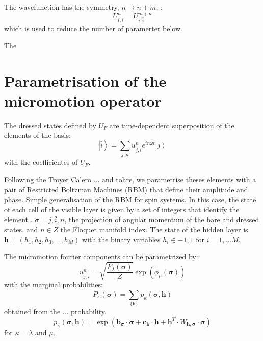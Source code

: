 \documentclass[pra,twocolumn,showkeys,preprintnumbers, amsmath,amssymb, aps,A4paper]{revtex4-1}
\begin{document}
The wavefunction has the symmetry, $n \rightarrow n+m$,  :
\begin{equation}
U_{i,\bar{i}}^n = U_{i,\bar{i}}^{m+n}
\end{equation}
which is used to reduce the number of paramerter below.

The 

\section{Parametrisation of the micromotion operator}

The dressed states defined by $U_F$ are time-dependent superposition of the elements of the basis:
\begin{equation}
\left| \bar{i} \right\rangle = \sum_{j,n} u^{n}_{j,\bar{i}} e^{i n \omega t}\left|j \right\rangle
\end{equation}
with the coefficientes of $U_F$. 

Following the Troyer Calero ... and tohre, we parametrise theses elements with a pair of Restricted Boltzman Machines (RBM) that define their amplitude and phase. Simple generalisation of the RBM for spin systems. In this case, the state of each cell of the visible layer is given by a set of integers that identify the element .  $\sigma = {j,\bar{i},n}$, the projection of angular momentum of the bare and dressed states, and $n\in Z$ the Floquet manifold index. The state of the hidden layer is $\boldsymbol{h} = (h_1,h_2,h_3,\ldots,h_M)$ with the binary variables $h_i \in {-1,1}$ for $i=1,\ldots M$. 

The micromotion fourier components can be parametrized by:
\begin{equation}
u^{n}_{j,\bar{i}} = \sqrt{\frac{P_{\lambda}(\boldsymbol{\sigma})}{Z}} \exp(\phi_{\mu}(\boldsymbol{\sigma}))
\end{equation}
with the marginal probabilities:
\begin{equation}
P_{\kappa}(\boldsymbol{\sigma}) = \sum_{\{\boldsymbol{h}\}} p_{\kappa}(\boldsymbol{\sigma},\boldsymbol{h})
\end{equation}
obtained from the ... probability.
\begin{equation}
p_{\kappa}(\boldsymbol{\sigma},\boldsymbol{h}) = \exp (\boldsymbol{b}_{\boldsymbol{\sigma}} \cdot \boldsymbol{\sigma} + \boldsymbol{c}_{\boldsymbol{h}} \cdot \boldsymbol{h} + \boldsymbol{h}^T \cdot W_{\boldsymbol{h},\boldsymbol{\sigma}} \cdot \boldsymbol{\sigma})
\end{equation}
for $\kappa={\lambda}$ and $\mu$.
\end{document}
